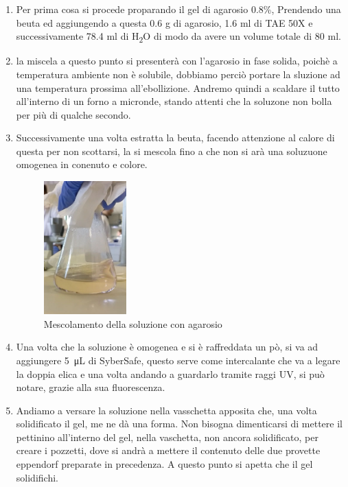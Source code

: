 \begin{enumerate}

	\item Per prima cosa si procede proparando il gel di agarosio 0.8\%, Prendendo una beuta ed aggiungendo a questa 0.6 g di agarosio, 1.6 ml di TAE 50X e successivamente 78.4 ml di H\textsubscript{2}O di modo da avere un volume totale di 80 ml.

	\item la miscela a questo punto si presenterà con l'agarosio in fase solida, poichè a temperatura ambiente non è solubile, dobbiamo perciò portare la sluzione ad una temperatura prossima all'ebollizione. Andremo quindi a scaldare il tutto all'interno di un forno a micronde, stando attenti che la soluzone non bolla per più di qualche secondo.

	\item Successivamente una volta estratta la beuta, facendo attenzione al calore di questa per non scottarsi, la si mescola fino a che non si arà una soluzuone omogenea in conenuto e colore.

	\begin{figure}[H]

		\centering
		\includegraphics[width=0.3\textwidth]{./immagini/agarosio.jpg}
		\caption{Mescolamento della soluzione con agarosio}
		\label{agarosio}

	\end{figure}

	\item Una volta che la soluzione è omogenea e si è raffreddata un pò, si va ad aggiungere \SI{5}{\micro\liter} di SyberSafe, questo serve come intercalante che va a legare la doppia elica e una volta andando a guardarlo tramite raggi UV, si può notare, grazie alla sua fluorescenza.

	\item Andiamo a versare la soluzione nella vasschetta apposita che, una volta solidificato il gel, me ne dà una forma. Non bisogna dimenticarsi di mettere il pettinino all'interno del gel, nella vaschetta, non ancora solidificato, per creare i pozzetti, dove si andrà a mettere il contenuto delle due provette eppendorf preparate in precedenza. A questo punto si apetta che il gel solidifichi.


\end{enumerate}
